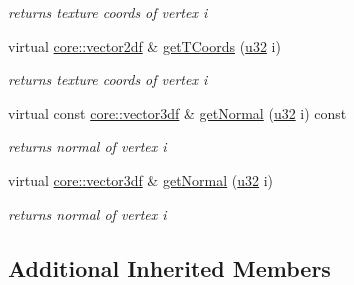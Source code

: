 \begin{DoxyCompactItemize}
\begin{DoxyCompactList}\small\item\em returns texture coords of vertex i \end{DoxyCompactList}\item 
\mbox{\label{classirr_1_1scene_1_1IDynamicMeshBuffer_aa366aaa5bc8488af18a3814a30cb7f09}} 
virtual \hyperlink{namespaceirr_1_1core_a2cf08556d77f6f5a792973a6e27ed11b}{core\+::vector2df} \& \hyperlink{classirr_1_1scene_1_1IDynamicMeshBuffer_aa366aaa5bc8488af18a3814a30cb7f09}{get\+T\+Coords} (\hyperlink{namespaceirr_a0416a53257075833e7002efd0a18e804}{u32} i)
\begin{DoxyCompactList}\small\item\em returns texture coords of vertex i \end{DoxyCompactList}\item 
\mbox{\label{classirr_1_1scene_1_1IDynamicMeshBuffer_af4f8cbcaef9632e5b68b14d15d068218}} 
virtual const \hyperlink{namespaceirr_1_1core_a06f169d08b5c429f5575acb7edbad811}{core\+::vector3df} \& \hyperlink{classirr_1_1scene_1_1IDynamicMeshBuffer_af4f8cbcaef9632e5b68b14d15d068218}{get\+Normal} (\hyperlink{namespaceirr_a0416a53257075833e7002efd0a18e804}{u32} i) const
\begin{DoxyCompactList}\small\item\em returns normal of vertex i \end{DoxyCompactList}\item 
\mbox{\label{classirr_1_1scene_1_1IDynamicMeshBuffer_a8a1647d10585b9cd262feeeac98ae371}} 
virtual \hyperlink{namespaceirr_1_1core_a06f169d08b5c429f5575acb7edbad811}{core\+::vector3df} \& \hyperlink{classirr_1_1scene_1_1IDynamicMeshBuffer_a8a1647d10585b9cd262feeeac98ae371}{get\+Normal} (\hyperlink{namespaceirr_a0416a53257075833e7002efd0a18e804}{u32} i)
\begin{DoxyCompactList}\small\item\em returns normal of vertex i \end{DoxyCompactList}\end{DoxyCompactItemize}
\subsection*{Additional Inherited Members}


